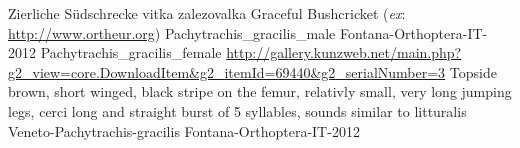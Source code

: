 {Zierliche S\"udschrecke} %
{vitka zalezovalka} %
{Graceful Bushcricket (\textit{ex}: \url{http://www.ortheur.org})} %
{Pachytrachis_gracilis_male} %
{Fontana-Orthoptera-IT-2012}%
{Pachytrachis_gracilis_female} %
{\url{http://gallery.kunzweb.net/main.php?g2_view=core.DownloadItem&g2_itemId=69440&g2_serialNumber=3}} %
{Topside brown, short winged, black stripe on the femur, relativly small, very long jumping legs, cerci long and straight} %
{burst of 5 syllables, sounds similar to litturalis} %
{Veneto-Pachytrachis-gracilis} %
{Fontana-Orthoptera-IT-2012}%

